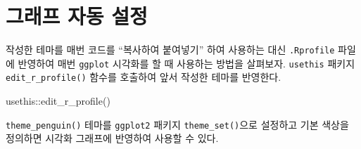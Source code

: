 \documentclass[
  letterpaper,
]{book}
\newenvironment{Shaded}{\begin{snugshade}}{\end{snugshade}}
\newcommand{\FunctionTok}[1]{\textcolor[rgb]{0.28,0.35,0.67}{#1}}
\newcommand{\NormalTok}[1]{\textcolor[rgb]{0.00,0.23,0.31}{#1}}
\newcommand{\SpecialCharTok}[1]{\textcolor[rgb]{0.37,0.37,0.37}{#1}}
\begin{document}
\hypertarget{uxadf8uxb798uxd504-uxc790uxb3d9-uxc124uxc815}{%
\section{그래프 자동
설정}\label{uxadf8uxb798uxd504-uxc790uxb3d9-uxc124uxc815}}

작성한 테마를 매번 코드를 ``복사하여 붙여넣기'' 하여 사용하는 대신
\texttt{.Rprofile} 파일에 반영하여 매번 \texttt{ggplot} 시각화를 할 때
사용하는 방법을 살펴보자. \texttt{usethis} 패키지
\texttt{edit\_r\_profile()} 함수를 호출하여 앞서 작성한 테마를 반영한다.

\begin{Shaded}
\begin{Highlighting}[]
\NormalTok{usethis}\SpecialCharTok{::}\FunctionTok{edit\_r\_profile}\NormalTok{()}
\end{Highlighting}
\end{Shaded}

\texttt{theme\_penguin()} 테마를 \texttt{ggplot2} 패키지
\texttt{theme\_set()}으로 설정하고 기본 색상을 정의하면 시각화 그래프에
반영하여 사용할 수 있다.
\end{document}
